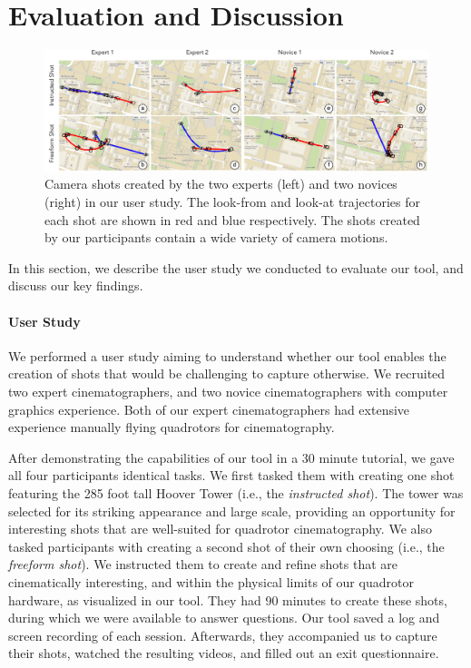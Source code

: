\section{Evaluation and Discussion}
\label{sec:ch2:results}

\begin{figure}[t]
\centering
\includegraphics[width=6.0in]{images/2015_siggraph_asia/eval_trajectories.pdf}
\caption{
Camera shots created by the two experts (left) and two novices (right) in our user study.
The look-from and look-at trajectories for each shot are shown in red and blue respectively. The shots created by our participants contain a wide variety of camera motions.
}
\label{fig:ch2:all_shots}
\end{figure}

In this section, we describe the user study we conducted to evaluate our tool, and discuss our key findings.

\paragraph{User Study}

We performed a user study aiming to understand whether our tool enables the creation of shots that would be challenging to capture otherwise.
We recruited two expert cinematographers, and two novice cinematographers with computer graphics experience. Both of our expert cinematographers had extensive experience manually flying quadrotors for cinematography.

After demonstrating the capabilities of our tool in a 30 minute tutorial, we gave all four participants identical tasks.
We first tasked them with creating one shot featuring the 285 foot tall Hoover Tower (i.e., the \emph{instructed shot}).
The tower was selected for its striking appearance and large scale, providing an opportunity for interesting shots that are well-suited for quadrotor cinematography.
We also tasked participants with creating a second shot of their own choosing (i.e., the \emph{freeform shot}).
We instructed them to create and refine shots that are cinematically interesting, and within the physical limits of our quadrotor hardware, as visualized in our tool.
They had 90 minutes to create these shots, during which we were available to answer questions.
Our tool saved a log and screen recording of each session.
Afterwards, they accompanied us to capture their shots, watched the resulting videos, and filled out an exit questionnaire.

